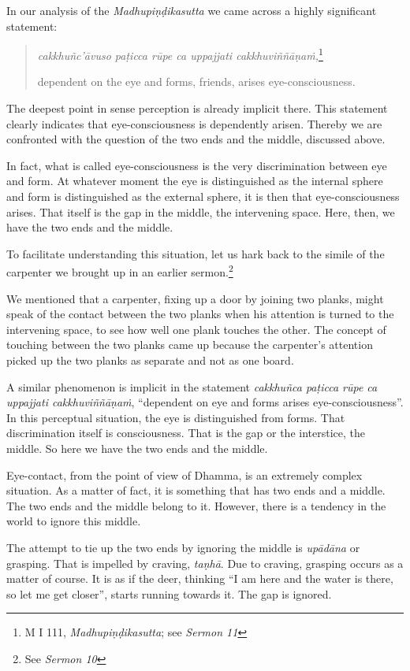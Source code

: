 In our analysis of the \emph{Madhupiṇḍikasutta} we came across a highly significant statement:

\begin{quote}
\emph{cakkhuñc'āvuso paṭicca rūpe ca uppajjati cakkhuviññāṇaṁ,}\footnote{M I 111, \emph{Madhupiṇḍikasutta}; see \emph{Sermon 11}}

dependent on the eye and forms, friends, arises eye-consciousness.
\end{quote}

The deepest point in sense perception is already implicit there. This statement clearly indicates that eye-consciousness is dependently arisen. Thereby we are confronted with the question of the two ends and the middle, discussed above.

In fact, what is called eye-consciousness is the very discrimination between eye and form. At whatever moment the eye is distinguished as the internal sphere and form is distinguished as the external sphere, it is then that eye-consciousness arises. That itself is the gap in the middle, the intervening space. Here, then, we have the two ends and the middle.

To facilitate understanding this situation, let us hark back to the simile of the carpenter we brought up in an earlier sermon.\footnote{See \emph{Sermon 10}}

We mentioned that a carpenter, fixing up a door by joining two planks, might speak of the contact between the two planks when his attention is turned to the intervening space, to see how well one plank touches the other. The concept of touching between the two planks came up because the carpenter's attention picked up the two planks as separate and not as one board.

A similar phenomenon is implicit in the statement \emph{cakkhuñca paṭicca rūpe ca uppajjati cakkhuviññāṇaṁ}, ``dependent on eye and forms arises eye-consciousness''. In this perceptual situation, the eye is distinguished from forms. That discrimination itself is consciousness. That is the gap or the interstice, the middle. So here we have the two ends and the middle.

\enlargethispage{\baselineskip}

Eye-contact, from the point of view of Dhamma, is an extremely complex situation. As a matter of fact, it is something that has two ends and a middle. The two ends and the middle belong to it. However, there is a tendency in the world to ignore this middle.

The attempt to tie up the two ends by ignoring the middle is \emph{upādāna} or grasping. That is impelled by craving, \emph{taṇhā}. Due to craving, grasping occurs as a matter of course. It is as if the deer, thinking ``I am here and the water is there, so let me get closer'', starts running towards it. The gap is ignored.

